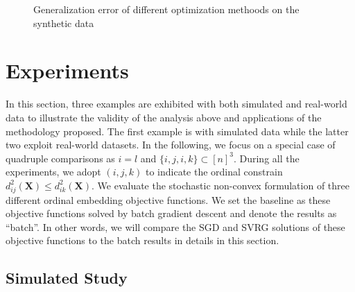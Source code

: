 \documentclass[letterpaper]{article}
\begin{document}
\begin{figure}
{			}
			\caption{Generalization error of different optimization methoods on the synthetic data}
			\label{fig:1} %
		\end{figure}

		\section{Experiments}
		In this section, three examples are exhibited with both simulated and real-world data to illustrate the validity of the analysis above and applications of the methodology proposed. The first example is with simulated data while the latter two exploit real-world datasets. In the following, we focus on a special case of quadruple comparisons as $i=l$ and $\{i,j,i,k\}\subset[n]^3$. During all the experiments, we adopt $(i,j,k)$ to indicate the ordinal constrain $d^2_{ij}(\mathbf{X})\leq d^2_{ik}(\mathbf{X})$. We evaluate the stochastic non-convex formulation of three different ordinal embedding objective functions. We set the baseline as these objective functions solved by batch gradient descent and denote the results as ``batch''. In other words, we will compare the SGD and SVRG solutions of these objective functions to the batch results in details in this section.

		\subsection{Simulated Study}
\end{document}
